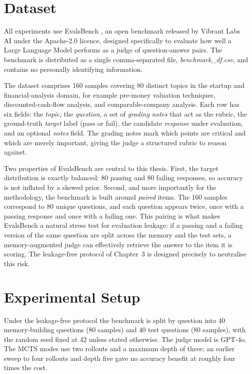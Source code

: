 \documentclass[14pt,a4paper]{extreport}
\begin{document}
\section{Dataset}

All experiments use EvalsBench \cite{evalsbench2024}, an open benchmark released by Vibrant Labs AI under the Apache-2.0 licence, designed specifically to evaluate how well a Large Language Model performs as a judge of question-answer pairs. The benchmark is distributed as a single comma-separated file, \emph{benchmark\_df.csv}, and contains no personally identifying information.

The dataset comprises 160 samples covering 80 distinct topics in the startup and financial-analysis domain, for example pre-money valuation techniques, discounted-cash-flow analysis, and comparable-company analysis. Each row has six fields: the \emph{topic}, the \emph{question}, a set of \emph{grading notes} that act as the rubric, the ground-truth \emph{target} label (pass or fail), the candidate \emph{response} under evaluation, and an optional \emph{notes} field. The grading notes mark which points are critical and which are merely important, giving the judge a structured rubric to reason against.

Two properties of EvalsBench are central to this thesis. First, the target distribution is exactly balanced: 80 passing and 80 failing responses, so accuracy is not inflated by a skewed prior. Second, and more importantly for the methodology, the benchmark is built around \emph{paired} items. The 160 samples correspond to 80 unique questions, and each question appears twice, once with a passing response and once with a failing one. This pairing is what makes EvalsBench a natural stress test for evaluation leakage: if a passing and a failing version of the same question are split across the memory and the test sets, a memory-augmented judge can effectively retrieve the answer to the item it is scoring. The leakage-free protocol of Chapter~3 is designed precisely to neutralise this risk.

\section{Experimental Setup}

Under the leakage-free protocol the benchmark is split by question into 40 memory-building questions (80 samples) and 40 test questions (80 samples), with the random seed fixed at 42 unless stated otherwise. The judge model is GPT-4o. The MCTS modes use two rollouts and a maximum depth of three; an earlier sweep to four rollouts and depth five gave no accuracy benefit at roughly four times the cost.
\end{document}
